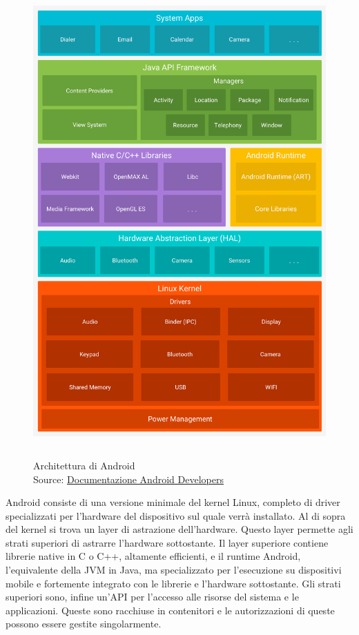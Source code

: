    \begin{figure}[H]
      \begin{center}
         \includegraphics[width=14cm,height=18cm,keepaspectratio]{immagini/android-stack}
      \end{center}
      \caption[Architettura di Android]{Architettura di Android
      \\
      Source: \href{https://developer.android.com/guide/platform/index.html}{Documentazione Android Developers}}
   \end{figure}
   Android consiste di una versione minimale del kernel Linux, completo di driver specializzati per l'hardware del dispositivo sul quale verrà installato. Al di sopra del kernel si trova un layer di astrazione dell'hardware. Questo layer permette agli strati superiori di astrarre l'hardware sottostante. Il layer superiore contiene librerie native in C o C++, altamente efficienti, e il runtime Android, l'equivalente della \gls{JVM} in Java, ma specializzato per l'esecuzione su dispositivi mobile e fortemente integrato con le librerie e l'hardware sottostante. Gli strati superiori sono, infine un'API per l'accesso alle risorse del sistema e le applicazioni. Queste sono racchiuse in contenitori e le autorizzazioni di queste possono essere gestite singolarmente.

